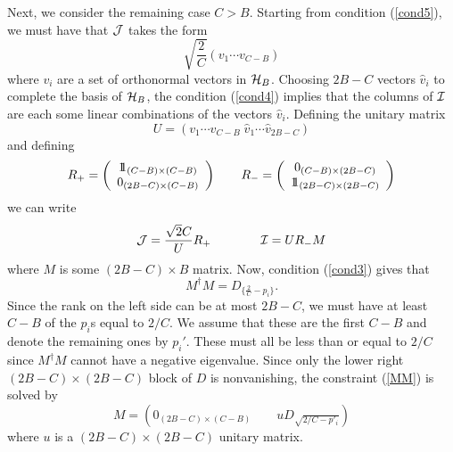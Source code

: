 \documentclass[12pt]{article}
\theoremstyle{definition}
\newcommand{\be}{\begin{equation}}
\newcommand{\ee}{\end{equation}}
\newcommand{\ba}{\begin{array}}
\newcommand{\ea}{\end{array}}
\def\identity{{\rlap{1} \hskip 1.6pt \hbox{1}}}
\begin{document}
Next, we consider the remaining case $C > B$. Starting from condition (\ref{cond5}), we must have that ${\cal J}$ takes the form
\be
\sqrt{\frac{2}{C}} \left( v_1 \cdots v_{C-B} \right)
\ee
where $v_i$ are a set of orthonormal vectors in ${\cal H}_B$. Choosing $2B-C$ vectors $\hat{v}_i$ to complete the basis of ${\cal H}_B$, the condition (\ref{cond4}) implies that the columns of ${\cal I}$ are each some linear combinations of the vectors $\hat{v}_i$. Defining the unitary matrix
\be
U = \left( v_1 \cdots v_{C-B} \;  \hat{v}_1 \cdots \hat{v}_{2B - C} \right)
\ee
and defining
\be
R_+ = \left( \ba{c} \identity_{(C-B) \times (C - B)} \cr 0_{(2B - C) \times (C - B)} \ea \right) \qquad R_- = \left( \ba{c} 0_{(C-B) \times (2B - C)} \cr \identity_{(2B - C) \times (2B - C)} \ea \right)
\ee
we can write
\be
{\cal J} = \frac{\sqrt{2}{C}} U R_+ \qquad \qquad {\cal I} = U R_- M
\ee
where $M$ is some $(2B - C) \times B$ matrix. Now, condition (\ref{cond3}) gives that
\be
\label{MM}
M^\dagger M = D_{\{\frac{2}{C}-p_i\}}.
\ee
Since the rank on the left side can be at most $2B -C$, we must have at least $C -B$ of the $p_i$s equal to $2/C$. We assume that these are the first $C-B$ and denote the remaining ones by $p_i'$. These must all be less than or equal to $2/C$ since $M^\dagger M$ cannot have a negative eigenvalue. Since only the lower right $(2B -C) \times (2B - C)$ block of $D$ is nonvanishing, the constraint (\ref{MM}) is solved by
\be
M = \left( 0_{(2B-C) \times (C-B)} \qquad u D_{\sqrt{2/C-p'_i}} \right)
\ee
where $u$ is a $(2B-C) \times (2B - C)$ unitary matrix.
\end{document}
